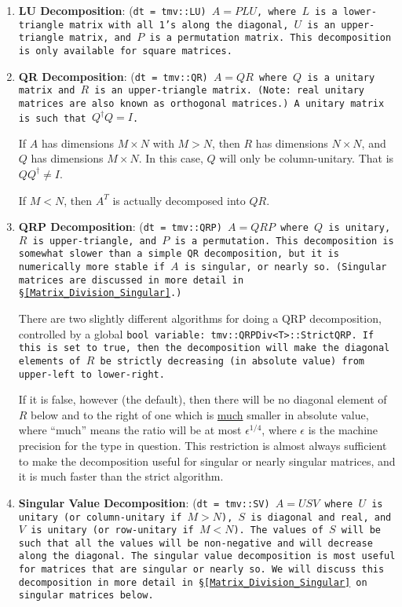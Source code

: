 \begin{enumerate}
\item
\textbf{LU Decomposition}: 
(\tt{dt} = \tt{tmv::LU}) $A = P L U$, where $L$ is a lower-triangle 
matrix with all 1's along the diagonal, $U$ is an upper-triangle matrix, 
and $P$ is a permutation matrix.  This decomposition is only available for 
square matrices.

\item
\textbf{QR Decomposition}: 
(\tt{dt} = \tt{tmv::QR}) $A = Q R$ where $Q$ is a unitary matrix
and $R$ is an upper-triangle matrix.  (Note: real unitary matrices are
also known as orthogonal matrices.)  A unitary matrix is such that
$Q^\dagger Q = I$. 

If $A$ has dimensions $M \times N$ with $M > N$, 
then $R$ has dimensions $N \times N$, and $Q$
has dimensions $M \times N$.  In this case, $Q$ will
only be column-unitary.  That is $Q Q^\dagger \neq I$.

If $M < N$, then $A^T$ is actually decomposed into $Q R$.

\item
\textbf{QRP Decomposition}: 
(\tt{dt} = \tt{tmv::QRP}) $A = Q R P$ where $Q$ is unitary, $R$ is 
upper-triangle, and $P$ is a permutation.  This decomposition is somewhat
slower than a simple QR decomposition, but it is numerically more stable if
$A$ is singular, or nearly so.  
(Singular matrices are discussed in more detail in \S\ref{Matrix_Division_Singular}.)

There are two slightly different algorithms for doing a QRP decomposition, controlled by a global
\tt{bool} variable: \tt{tmv::QRPDiv<T>::StrictQRP}.
If this is set to true, then the decomposition will make the diagonal elements
of $R$ be strictly decreasing (in absolute value) from upper-left to lower-right.

If it is false, however (the default), then there will be no diagonal element
of $R$ below and to the right of one which is \underline{much} smaller in absolute value,
where ``much'' means the ratio will be at most $\epsilon^{1/4}$, where 
$\epsilon$ is the machine precision for the type in question.  This restriction
is almost always sufficient to make the decomposition useful for singular or nearly
singular matrices, and it is much faster than the strict algorithm.

\item
\textbf{Singular Value Decomposition}: 
(\tt{dt} = \tt{tmv::SV}) $A = U S V$ where $U$ is unitary
(or column-unitary if $M > N$), $S$ is diagonal and real, and $V$ is unitary 
(or row-unitary if $M < N$).  The values of $S$ will be such that all the values will
be non-negative and will decrease along the diagonal.
The singular value decomposition is most useful
for matrices that are singular or nearly so.  
We will discuss this decomposition in more detail in \S\ref{Matrix_Division_Singular} on
singular matrices below.

\end{enumerate}

